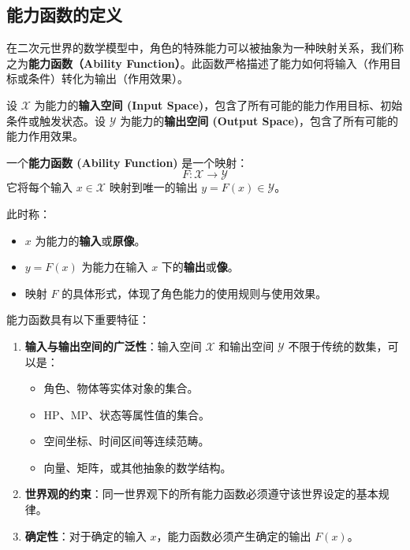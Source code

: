 \subsection{能力函数的定义}\label{subsec:functionandusefulfunction}

在二次元世界的数学模型中，角色的特殊能力可以被抽象为一种映射关系，我们称之为\textbf{能力函数（Ability Function）}。此函数严格描述了能力如何将输入（作用目标或条件）转化为输出（作用效果）。

\begin{definition}[能力函数]
    设 $\mathcal{X}$ 为能力的\textbf{输入空间 (Input Space)}，包含了所有可能的能力作用目标、初始条件或触发状态。设 $\mathcal{Y}$ 为能力的\textbf{输出空间 (Output Space)}，包含了所有可能的能力作用效果。

    一个\textbf{能力函数 (Ability Function)} 是一个映射：
    \begin{equation}
        F: \mathcal{X} \to \mathcal{Y}
    \end{equation}
    它将每个输入 $x \in \mathcal{X}$ 映射到唯一的输出 $y = F(x) \in \mathcal{Y}$。

    此时称：
    \begin{itemize}
        \item $x$ 为能力的\textbf{输入}或\textbf{原像}。
        \item $y = F(x)$ 为能力在输入 $x$ 下的\textbf{输出}或\textbf{像}。
        \item 映射 $F$ 的具体形式，体现了角色能力的使用规则与使用效果。
    \end{itemize}
\end{definition}

能力函数具有以下重要特征：
\begin{enumerate}
    \item \textbf{输入与输出空间的广泛性}：输入空间 $\mathcal{X}$ 和输出空间 $\mathcal{Y}$ 不限于传统的数集，可以是：
          \begin{itemize}
              \item 角色、物体等实体对象的集合。
              \item HP、MP、状态等属性值的集合。
              \item 空间坐标、时间区间等连续范畴。
              \item 向量、矩阵，或其他抽象的数学结构。
          \end{itemize}
    \item \textbf{世界观的约束}：同一世界观下的所有能力函数必须遵守该世界设定的基本规律。
    \item \textbf{确定性}：对于确定的输入 $x$，能力函数必须产生确定的输出 $F(x)$。
\end{enumerate}

